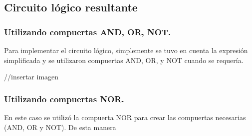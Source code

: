 \subsection{Circuito lógico resultante}
\subsubsection{Utilizando compuertas AND, OR, NOT.}
Para implementar el circuito lógico, simplemente se tuvo en cuenta la expresión simplificada y se utilizaron compuertas AND, OR, y NOT cuando se requería.

//insertar imagen

\subsubsection{Utilizando compuertas NOR.}

En este caso se utilizó la compuerta NOR para crear las compuertas necesarias (AND, OR y NOT).
De esta manera

